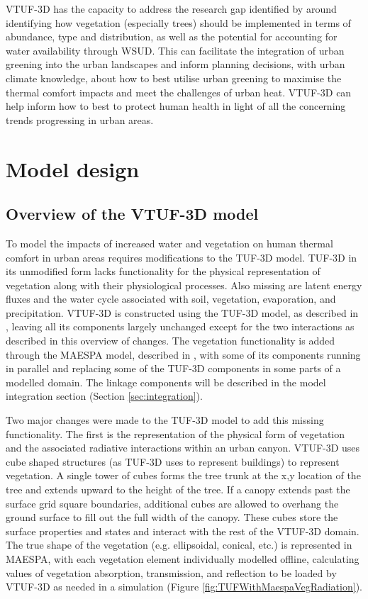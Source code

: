 \documentclass[final,3p,times,authoryear]{elsarticle}
\begin{document}
VTUF-3D has the capacity to address the research gap identified by \cite{Bowler2010} around identifying how vegetation (especially trees) should be implemented in terms of abundance, type and distribution, as well as the potential for accounting for water availability through WSUD. This can facilitate the integration of urban greening into the urban landscapes and inform planning decisions, with urban climate knowledge, about how to best utilise urban greening to maximise the thermal comfort impacts and meet the challenges of urban heat. VTUF-3D can help inform how to best to protect human health in light of all the concerning trends progressing in urban areas.

\section{Model design}\label{sec:method}

\subsection{Overview of the VTUF-3D model}\label{sec:DesignOverview}

To model the impacts of increased water and vegetation on human thermal comfort in urban areas requires modifications to the TUF-3D \citep{Krayenhoff2007} model. TUF-3D in its unmodified form lacks functionality for the physical representation of vegetation along with their physiological processes. Also missing are latent energy fluxes and the water cycle associated with soil, vegetation, evaporation, and precipitation. VTUF-3D is constructed using the TUF-3D model, as described in \cite{Krayenhoff2007}, leaving all its components largely unchanged except for the two interactions as described in this overview of changes. The vegetation functionality is added through the MAESPA model, described in \cite{Duursma2012}, with some of its components running in parallel and replacing some of the TUF-3D components in some parts of a modelled domain. The linkage components will be described in the model integration section (Section \ref{sec:integration}).

Two major changes were made to the TUF-3D model to add this missing functionality. The first is the representation of the physical form of vegetation and the associated radiative interactions within an urban canyon. VTUF-3D uses cube shaped structures (as TUF-3D uses to represent buildings) to represent vegetation. A single tower of cubes forms the tree trunk at the x,y location of the tree and extends upward to the height of the tree. If a canopy extends past the surface grid square boundaries, additional cubes are allowed to overhang the ground surface to fill out the full width of the canopy. These cubes store the surface properties and states and interact with the rest of the VTUF-3D domain. The true shape of the vegetation (e.g. ellipsoidal, conical, etc.) is represented in MAESPA, with each vegetation element individually modelled offline, calculating values of vegetation absorption, transmission, and reflection to be loaded by VTUF-3D as needed in a simulation (Figure \ref{fig:TUFWithMaespaVegRadiation}).
\end{document}
